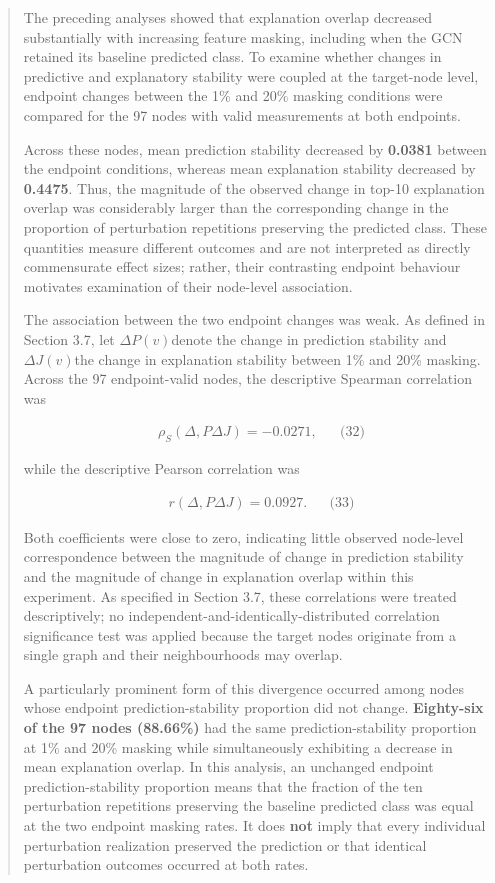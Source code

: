 \documentclass[a4paper]{article}
\begin{document}
\begin{quote}
The preceding analyses showed that explanation overlap decreased
substantially with increasing feature masking, including when the GCN
retained its baseline predicted class. To examine whether changes in
predictive and explanatory stability were coupled at the target-node
level, endpoint changes between the 1\% and 20\% masking conditions were
compared for the 97 nodes with valid measurements at both endpoints.

Across these nodes, mean prediction stability decreased by
\textbf{0.0381} between the endpoint conditions, whereas mean
explanation stability decreased by \textbf{0.4475}. Thus, the magnitude
of the observed change in top-10 explanation overlap was considerably
larger than the corresponding change in the proportion of perturbation
repetitions preserving the predicted class. These quantities measure
different outcomes and are not interpreted as directly commensurate
effect sizes; rather, their contrasting endpoint behaviour motivates
examination of their node-level association.

The association between the two endpoint changes was weak. As defined in
Section 3.7, let \(\Delta P(v)\)denote the change in prediction
stability and \(\Delta J(v)\)the change in explanation stability between
1\% and 20\% masking. Across the 97 endpoint-valid nodes, the
descriptive Spearman correlation was

\[\begin{matrix}
 & \rho_{S}\left( \Delta,P\Delta J \right) = - 0.0271, & & \text{(32)}
\end{matrix}
\]

while the descriptive Pearson correlation was

\[\begin{matrix}
 & r\left( \Delta,P\Delta J \right) = 0.0927. & & \text{(33)}
\end{matrix}
\]

Both coefficients were close to zero, indicating little observed
node-level correspondence between the magnitude of change in prediction
stability and the magnitude of change in explanation overlap within this
experiment. As specified in Section 3.7, these correlations were treated
descriptively; no independent-and-identically-distributed correlation
significance test was applied because the target nodes originate from a
single graph and their neighbourhoods may overlap.

A particularly prominent form of this divergence occurred among nodes
whose endpoint prediction-stability proportion did not change.
\textbf{Eighty-six of the 97 nodes (88.66\%)} had the same
prediction-stability proportion at 1\% and 20\% masking while
simultaneously exhibiting a decrease in mean explanation overlap. In
this analysis, an unchanged endpoint prediction-stability proportion
means that the fraction of the ten perturbation repetitions preserving
the baseline predicted class was equal at the two endpoint masking
rates. It does \textbf{not} imply that every individual perturbation
realization preserved the prediction or that identical perturbation
outcomes occurred at both rates.


\end{quote}
\end{document}
